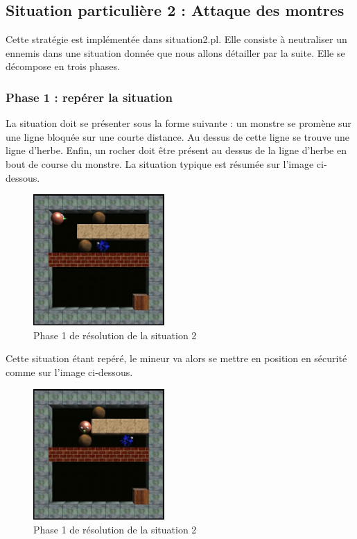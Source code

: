 \documentclass[a4paper,11pt]{article}
\begin{document}
	\newpage
	\subsection{Situation particulière 2 : Attaque des montres}
	
	Cette stratégie est implémentée dans situation2.pl. Elle consiste à neutraliser un ennemis dans une situation donnée que nous allons détailler par la suite. Elle se décompose en trois phases.

	\subsubsection{Phase 1 : repérer la situation}
	
La situation doit se présenter sous la forme suivante : un monstre se promène sur une ligne bloquée sur une courte distance. Au dessus de cette ligne se trouve une ligne d’herbe. Enfin, un rocher doit être présent au dessus de la ligne d’herbe en bout de course du monstre. La situation typique est résumée sur l’image ci-dessous.  
	
		\begin{figure}[h]
			\center
			\includegraphics[width=5cm]{situation2-1}
			\caption{\label{situation21} Phase 1 de résolution de la situation 2 }
		\end{figure}
	
Cette situation étant repéré, le mineur va alors se mettre en position en sécurité comme sur l’image ci-dessous.
	 
		\begin{figure}[h]
			\center
			\includegraphics[width=5cm]{situation2-2}
			\caption{\label{situation22} Phase 1 de résolution de la situation 2 }
		\end{figure}
	 
\end{document}
